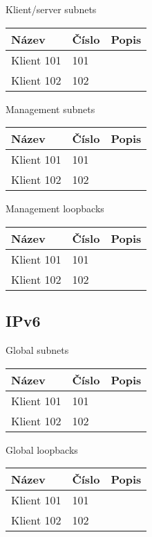 \documentclass[czech,master,dept460,male,cpp,cpdeclaration]{diploma}
\begin{document}
\noindent Klient/server subnets
\begin{center}
	\begin{tabular}{l|l|l}
		Název & Číslo & Popis \\
		\hline
		Klient 101 & 101 & \\
		Klient 102 & 102 & \\
	\end{tabular}
\end{center}

\noindent Management subnets
\begin{center}
	\begin{tabular}{l|l|l}
		Název & Číslo & Popis \\
		\hline
		Klient 101 & 101 & \\
		Klient 102 & 102 & \\
	\end{tabular}
\end{center}

\noindent Management loopbacks
\begin{center}
	\begin{tabular}{l|l|l}
		Název & Číslo & Popis \\
		\hline
		Klient 101 & 101 & \\
		Klient 102 & 102 & \\
	\end{tabular}
\end{center}


\subsection{IPv6}
\label{subsec:Sec042}

\noindent Global subnets
\begin{center}
	\begin{tabular}{l|l|l}
		Název & Číslo & Popis \\
		\hline
		Klient 101 & 101 & \\
		Klient 102 & 102 & \\
	\end{tabular}
\end{center}

\noindent Global loopbacks
\begin{center}
	\begin{tabular}{l|l|l}
		Název & Číslo & Popis \\
		\hline
		Klient 101 & 101 & \\
		Klient 102 & 102 & \\
	\end{tabular}
\end{center}
\end{document}

